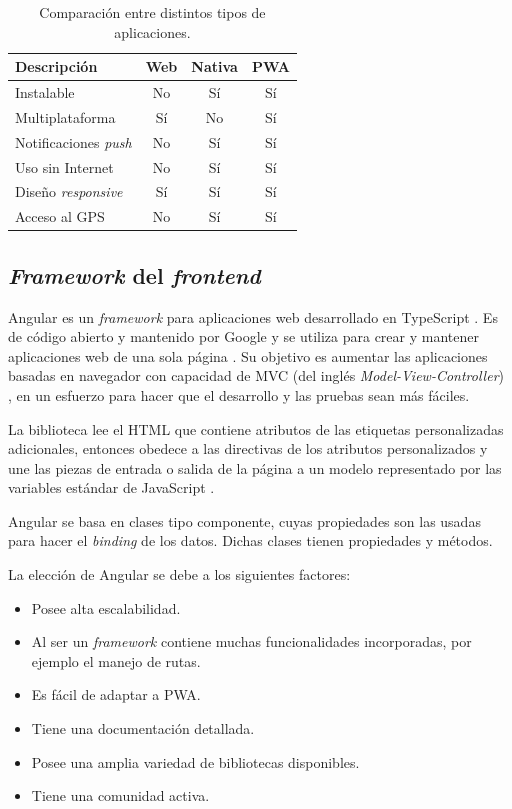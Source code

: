 \begin{table}[h]
	\centering
	\caption[Comparación entre distintos tipos de aplicaciones]{Comparación entre distintos tipos de aplicaciones.}
	\begin{tabular}{l c c c}    
		\toprule
		\textbf{Descripción} & \textbf{Web} & \textbf{Nativa} & \textbf{PWA}\\
		\midrule
		Instalable & No & Sí & Sí \\	
		Multiplataforma & Sí & No & Sí \\	
		Notificaciones \emph{push} & No & Sí & Sí \\	
		Uso sin Internet & No & Sí & Sí \\	
		Diseño \emph{responsive} \citep{WEBSITE:RESPONSIVE} & Sí & Sí & Sí \\	
		Acceso al GPS & No & Sí & Sí \\
		\bottomrule
		\hline
	\end{tabular}
	\label{tab:tablaComparacionAplicaciones}
\end{table}

\subsection{\emph{Framework} del \emph{frontend}}

Angular \citep{WEBSITE:ANGULAR} es un \emph{framework} \citep{WEBSITE:FRAMEWORK} para aplicaciones web desarrollado en TypeScript \citep{WEBSITE:TYPESCRIPT}. Es de código abierto y mantenido por Google y se utiliza para crear y mantener aplicaciones web de una sola página \citep{WEBSITE:SPA}. Su objetivo es aumentar las aplicaciones basadas en navegador con capacidad de MVC (del inglés \textit{Model-View-Controller}) \citep{WEBSITE:MVC}, en un esfuerzo para hacer que el desarrollo y las pruebas sean más fáciles.

La biblioteca lee el HTML que contiene atributos de las etiquetas personalizadas adicionales, entonces obedece a las directivas de los atributos personalizados y une las piezas de entrada o salida de la página a un modelo representado por las variables estándar de JavaScript \citep{WEBSITE:JAVASCRIPT}.

Angular se basa en clases tipo componente, cuyas propiedades son las usadas para hacer el \emph{binding} de los datos. Dichas clases tienen propiedades y métodos.

La elección de Angular se debe a los siguientes factores: 
\begin{itemize}
	\item Posee alta escalabilidad.
	\item Al ser un \emph{framework} contiene muchas funcionalidades incorporadas, por ejemplo el manejo de rutas.
	\item Es fácil de adaptar a PWA.
	\item Tiene una documentación detallada.
	\item Posee una amplia variedad de bibliotecas disponibles.
	\item Tiene una comunidad activa.
\end{itemize}

